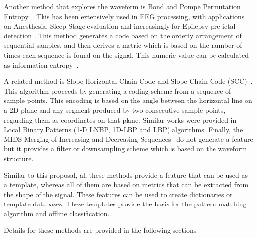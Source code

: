 Another method that explores the waveform is Bond and Pompe Permutation Entropy~\cite{Bandt2002}.  This has been extensively used in EEG processing, with applications on Anesthesia, Sleep Stage evaluation and increasingly for Epilepsy pre-ictal detection .  This method generates a code based on the orderly arrangement of sequential samples, and then derives a metric which is based on the number of times each sequence is found on the signal.  This numeric value can be calculated as information entropy~\cite{Nicolaou2010}.

A related method is Slope Horizontal Chain Code and Slope Chain Code (SCC)~\cite{Alvarado-Gonzalez2016}. This algorithm proceeds by generating a coding scheme from a sequence of sample points. This encoding is based on the angle between the horizontal line on a 2D-plane and any segment produced by two consecutive sample points, regarding them as coordinates on that plane.  Similar works were provided in Local Binary Patterns  (1-D LNBP, 1D-LBP and LBP)\cite{Jaiswal2017} algorithms.  Finally, the  MIDS Merging of Increasing and Decreasing Sequences~\cite{Zhang2013} do not generate a feature but it provides a filter or downsampling scheme which is based on the waveform structure.

%

Similar to this proposal, all these methods provide a feature that can be used as a template, whereas all of them are based on metrics that can be extracted from the shape of the signal.  These features can be used to create dictionaries or template databases.  These templates provide the basis for the pattern matching algorithm and offline classification.

Details for these methods are provided in the following sections

